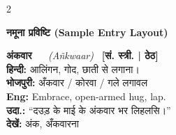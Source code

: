 \begin{multicols}{2}
\vspace{0.5em}

{\color{bpblue}\bfseries\small नमूना प्रविष्टि (Sample Entry Layout)}
\vspace{0.2em}

\begin{tcolorbox}[colback=bpbg,colframe=bpblue,arc=3pt,boxrule=0.5pt,top=4pt,bottom=4pt,left=6pt,right=6pt]
{\bfseries\large अंकवार} \ \K{\ba\banus\bka\bva\bmaa\bra} \, \textit{(Añkwaar)} \ \textbf{[सं. स्त्री. | ठेठ]} \ \starsThree \\
{\small\textbf{हिन्दी:} आलिंगन, गोद, छाती से लगाना।} \\
{\small\textbf{भोजपुरी:} अँकवार / कोरवा / गले लगावल} \\
{\small\textbf{Eng:} Embrace, open-armed hug, lap.} \\
{\small\color{bpbluedark}\textbf{उदा.:} ``दउड़ के माई के अंकवार भर लिहलसि।''} \\
{\small\color{bpgray}\textbf{देखें:} अंक, अँकवारना}
\end{tcolorbox}

\end{multicols}

